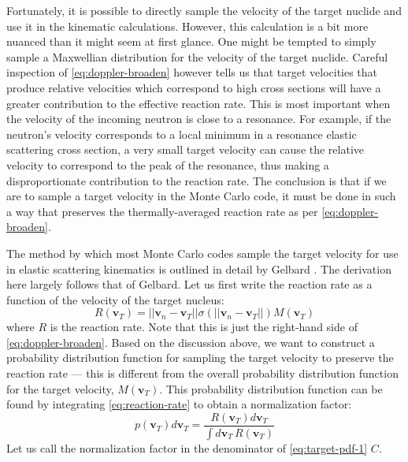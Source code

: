 Fortunately, it is possible to directly sample the velocity of the target
nuclide and use it in the kinematic calculations. However, this calculation is a
bit more nuanced than it might seem at first glance. One might be tempted to
simply sample a Maxwellian distribution for the velocity of the target nuclide.
Careful inspection of \eqref{eq:doppler-broaden} however tells us that target
velocities that produce relative velocities which correspond to high cross
sections will have a greater contribution to the effective reaction rate. This
is most important when the velocity of the incoming neutron is close to a
resonance. For example, if the neutron's velocity corresponds to a local minimum
in a resonance elastic scattering cross section, a very small target velocity
can cause the relative velocity to correspond to the peak of the resonance, thus
making a disproportionate contribution to the reaction rate. The conclusion is
that if we are to sample a target velocity in the Monte Carlo code, it must be
done in such a way that preserves the thermally-averaged reaction rate as per
\eqref{eq:doppler-broaden}.

The method by which most Monte Carlo codes sample the target velocity for use in
elastic scattering kinematics is outlined in detail by Gelbard
\cite{anl-gelbard-1979}. The derivation here largely follows that of
Gelbard. Let us first write the reaction rate as a function of the velocity of
the target nucleus:
\begin{equation}
  \label{eq:reaction-rate}
  R(\mathbf{v}_T) = || \mathbf{v}_n - \mathbf{v}_T || \sigma ( ||
  \mathbf{v}_n - \mathbf{v}_T || ) M ( \mathbf{v}_T )
\end{equation}
where $R$ is the reaction rate. Note that this is just the right-hand side of
\eqref{eq:doppler-broaden}. Based on the discussion above, we want to construct
a probability distribution function for sampling the target velocity to preserve
the reaction rate --- this is different from the overall probability
distribution function for the target velocity, $M ( \mathbf{v}_T )$. This
probability distribution function can be found by integrating
\eqref{eq:reaction-rate} to obtain a normalization factor:
\begin{equation}
  \label{eq:target-pdf-1}
  p( \mathbf{v}_T ) d\mathbf{v}_T = \frac{R(\mathbf{v}_T) d\mathbf{v}_T}{\int
    d\mathbf{v}_T \, R(\mathbf{v}_T)}
\end{equation}
Let us call the normalization factor in the denominator of
\eqref{eq:target-pdf-1} $C$.

